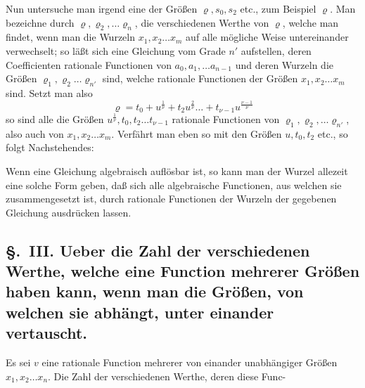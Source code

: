 \documentclass{article}
\begin{document}
Nun untersuche man irgend eine der Größen $\varrho, s_0, s_2$ etc., zum Beispiel $\varrho$. Man bezeichne durch $\varrho, \varrho_2, \ldots \varrho_n$, die verschiedenen Werthe von $\varrho$, welche man findet, wenn man die Wurzeln $x_1, x_2 \ldots x_m$ auf alle mögliche Weise untereinander verwechselt; so läßt sich eine Gleichung vom Grade $n'$ aufstellen, deren Coefficienten rationale Functionen von $a_0, a_1, \ldots a_{n-1}$ und deren Wurzeln die Größen $\varrho_1, \varrho_2 \ldots \varrho_{n'}$ sind, welche rationale Functionen der Größen $x_1, x_2 \ldots x_m$ sind. Setzt man also
\[ \varrho = t_0 + u^{\frac{1}{\nu}} + t_2 u^{\frac{2}{\nu}} \ldots + t_{\nu-1} u^{\frac{\nu-1}{\nu}} \]
so sind alle die Größen $u^{\frac{1}{\nu}}, t_0, t_2 \ldots t_{\nu-1}$ rationale Functionen von $\varrho_1, \varrho_2, \ldots \varrho_{n'}$, also auch von $x_1, x_2 \ldots x_m$. Verfährt man eben so mit den Größen $u, t_0, t_2$ etc., so folgt Nachstehendes:

Wenn eine Gleichung algebraisch auflösbar ist, so kann man der Wurzel allezeit eine solche Form geben, daß sich alle algebraische Functionen, aus welchen sie zusammengesetzt ist, durch rationale Functionen der Wurzeln der gegebenen Gleichung ausdrücken lassen.

\subsection*{§.~III. Ueber die Zahl der verschiedenen Werthe, welche eine Function mehrerer Größen haben kann, wenn man die Größen, von welchen sie abhängt, unter einander vertauscht.}

Es sei $v$ eine rationale Function mehrerer von einander unabhängiger Größen $x_1, x_2 \ldots x_n$. Die Zahl der verschiedenen Werthe, deren diese Func-
\end{document}
